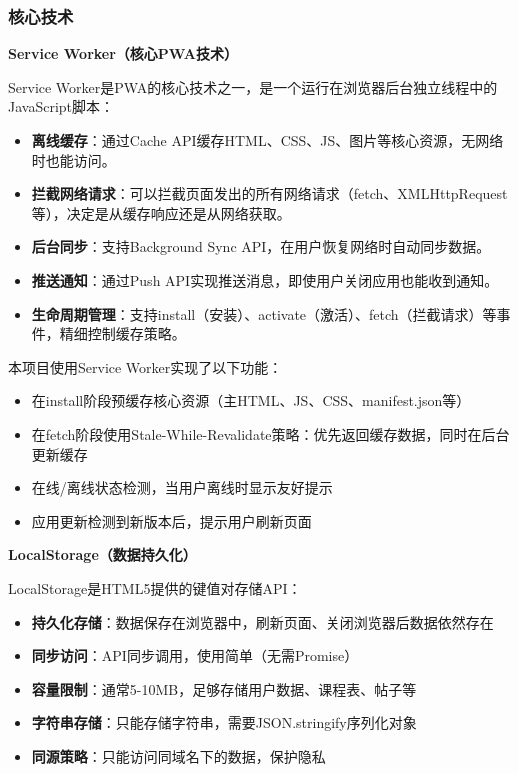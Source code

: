 \documentclass[12pt,a4paper]{article}
\begin{document}
\subsubsection{核心技术}

\textbf{Service Worker（核心PWA技术）}

Service Worker是PWA的核心技术之一，是一个运行在浏览器后台独立线程中的JavaScript脚本：

\begin{itemize}
    \item \textbf{离线缓存}：通过Cache API缓存HTML、CSS、JS、图片等核心资源，无网络时也能访问。
    \item \textbf{拦截网络请求}：可以拦截页面发出的所有网络请求（fetch、XMLHttpRequest等），决定是从缓存响应还是从网络获取。
    \item \textbf{后台同步}：支持Background Sync API，在用户恢复网络时自动同步数据。
    \item \textbf{推送通知}：通过Push API实现推送消息，即使用户关闭应用也能收到通知。
    \item \textbf{生命周期管理}：支持install（安装）、activate（激活）、fetch（拦截请求）等事件，精细控制缓存策略。
\end{itemize}

本项目使用Service Worker实现了以下功能：

\begin{itemize}
    \item 在install阶段预缓存核心资源（主HTML、JS、CSS、manifest.json等）
    \item 在fetch阶段使用Stale-While-Revalidate策略：优先返回缓存数据，同时在后台更新缓存
    \item 在线/离线状态检测，当用户离线时显示友好提示
    \item 应用更新检测到新版本后，提示用户刷新页面
\end{itemize}

\textbf{LocalStorage（数据持久化）}

LocalStorage是HTML5提供的键值对存储API：

\begin{itemize}
    \item \textbf{持久化存储}：数据保存在浏览器中，刷新页面、关闭浏览器后数据依然存在
    \item \textbf{同步访问}：API同步调用，使用简单（无需Promise）
    \item \textbf{容量限制}：通常5-10MB，足够存储用户数据、课程表、帖子等
    \item \textbf{字符串存储}：只能存储字符串，需要JSON.stringify序列化对象
    \item \textbf{同源策略}：只能访问同域名下的数据，保护隐私
\end{itemize}
\end{document}

